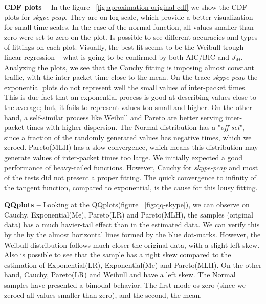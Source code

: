 \textbf{CDF plots --} In the figure ~\ref{fig:aproximation-original-cdf} we show the CDF plots for \textit{skype-pcap}. They are on log-scale, which provide a better visualization for small time scales. In the case of the normal function, all values smaller than zero were set to zero on the plot. Is possible to see different accuracies and types of fittings on each plot. Visually, the best fit seems to be the Weibull trough linear regression -- what is going to be confirmed by both AIC/BIC and $J_M$. Analyzing the plots,  we see that the Cauchy fitting is imposing almost constant traffic, with the inter-packet time close to the mean. On the trace \textit{skype-pcap} the exponential plots do not represent well the small values of inter-packet times. This is due fact that an exponential process is good at describing values close to the average; but, it fails to represent values too small and higher. On the other hand, a self-similar process like Weibull and Pareto are better serving inter-packet times with higher dispersion. The Normal distribution has a "\textit{off-set}", since a fraction of the randomly generated values has negative times, which we zeroed. Pareto(MLH) has a slow convergence, which means this distribution may generate values of inter-packet times too large. We initially expected a good performance of heavy-tailed functions. However, Cauchy for \textit{skype-pcap} and most of the tests did not present a proper fitting. The quick convergence to infinity of the tangent function, compared to exponential, is the cause for this lousy fitting.

\textbf{QQplots --} Looking at the QQplots(figure ~\ref{fig:qq-skype}),  we can observe on Cauchy, Exponential(Me), Pareto(LR) and Pareto(MLH), the samples (original data) has a much havier-tail effect than in the estimated data. We can verify this by the by the almost horizontal lines formed by the blue dot-marks. However, the Weibull distribution follows much closer the original data, with a slight left skew. Also is possible to see that the sample has a right skew compared to the estimation of Exponential(LR), Exponential(Me) and Pareto(MLH). On the other hand, Cauchy, Pareto(LR) and Weibull and have a left skew. The Normal samples have presented a bimodal behavior. The first mode os zero (since we zeroed all values smaller than zero), and the second, the mean.


